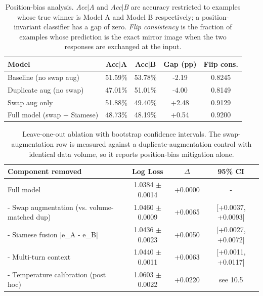 \begin{table}[!htbp]\centering
\caption{Position-bias analysis. \emph{Acc$\mid$A} and \emph{Acc$\mid$B} are accuracy restricted to examples whose true winner is Model A and Model B respectively; a position-invariant classifier has a gap of zero. \emph{Flip consistency} is the fraction of examples whose prediction is the exact mirror image when the two responses are exchanged at the input.}
\label{tab:position}
\begin{tabular}{@{}lcccc@{}}\toprule
\textbf{Model} & \textbf{Acc$\mid$A} & \textbf{Acc$\mid$B} & \textbf{Gap (pp)} & \textbf{Flip cons.} \\ \midrule
Baseline (no swap aug) & 51.59\% & 53.78\% & -2.19 & 0.8245 \\
Duplicate aug (no swap) & 47.01\% & 51.01\% & -4.00 & 0.8149 \\
Swap aug only & 51.88\% & 49.40\% & +2.48 & 0.9129 \\
Full model (swap + Siamese) & 48.73\% & 48.19\% & +0.54 & 0.9200 \\
\bottomrule\end{tabular}\end{table}

\begin{table}[!htbp]\centering
\caption{Leave-one-out ablation with bootstrap confidence intervals. The swap-augmentation row is measured against a duplicate-augmentation control with identical data volume, so it reports position-bias mitigation alone.}
\label{tab:ablation}
\begin{tabular}{@{}lccc@{}}\toprule
\textbf{Component removed} & \textbf{Log Loss} & \textbf{$\Delta$} & \textbf{95\% CI} \\ \midrule
Full model & 1.0384 $\pm$ 0.0014 & +0.0000 & - \\
- Swap augmentation (vs. volume-matched dup) & 1.0460 $\pm$ 0.0009 & +0.0065 & [+0.0037, +0.0093] \\
- Siamese fusion |e_A - e_B| & 1.0436 $\pm$ 0.0023 & +0.0050 & [+0.0027, +0.0072] \\
- Multi-turn context & 1.0440 $\pm$ 0.0011 & +0.0063 & [+0.0011, +0.0117] \\
- Temperature calibration (post hoc) & 1.0603 $\pm$ 0.0022 & +0.0220 & see 10.5 \\
\bottomrule\end{tabular}\end{table}

